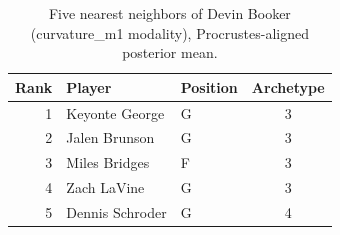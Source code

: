 \begin{table}[htbp]
  \centering\small
  \begin{tabular}{rllc}
    \toprule
    Rank & Player & Position & Archetype \\
    \midrule
    1 & Keyonte George & G & 3 \\
    2 & Jalen Brunson & G & 3 \\
    3 & Miles Bridges & F & 3 \\
    4 & Zach LaVine & G & 3 \\
    5 & Dennis Schroder & G & 4 \\
    \bottomrule
  \end{tabular}
  \caption{Five nearest neighbors of Devin Booker (curvature_m1 modality), Procrustes-aligned posterior mean.}
  \label{tab:Devin_Booker_neighbors_curvature_m1}
\end{table}

